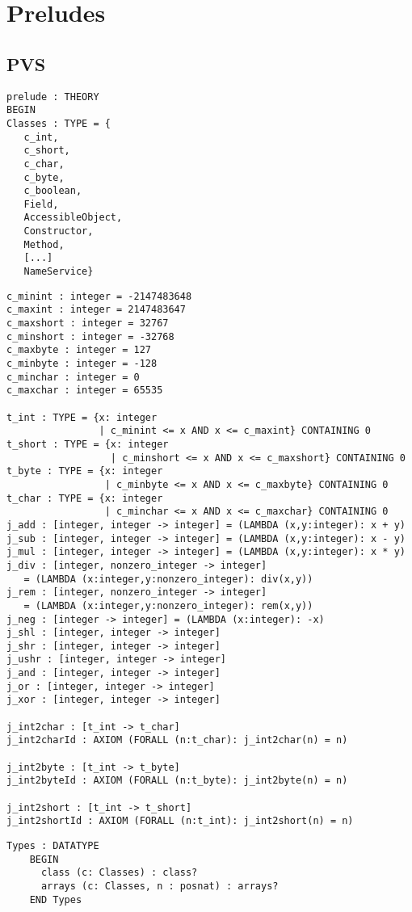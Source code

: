 \chapter{Preludes}
\section{PVS}
 \begin{verbatim}
prelude : THEORY
BEGIN
Classes : TYPE = {
   c_int,
   c_short,
   c_char,
   c_byte,
   c_boolean,
   Field,
   AccessibleObject,
   Constructor,
   Method,
   [...]
   NameService}
\end{verbatim}
\begin{verbatim}
c_minint : integer = -2147483648
c_maxint : integer = 2147483647
c_maxshort : integer = 32767
c_minshort : integer = -32768
c_maxbyte : integer = 127
c_minbyte : integer = -128
c_minchar : integer = 0
c_maxchar : integer = 65535

t_int : TYPE = {x: integer 
                | c_minint <= x AND x <= c_maxint} CONTAINING 0
t_short : TYPE = {x: integer 
                  | c_minshort <= x AND x <= c_maxshort} CONTAINING 0
t_byte : TYPE = {x: integer 
                 | c_minbyte <= x AND x <= c_maxbyte} CONTAINING 0
t_char : TYPE = {x: integer 
                 | c_minchar <= x AND x <= c_maxchar} CONTAINING 0
j_add : [integer, integer -> integer] = (LAMBDA (x,y:integer): x + y)
j_sub : [integer, integer -> integer] = (LAMBDA (x,y:integer): x - y)
j_mul : [integer, integer -> integer] = (LAMBDA (x,y:integer): x * y)
j_div : [integer, nonzero_integer -> integer] 
   = (LAMBDA (x:integer,y:nonzero_integer): div(x,y))
j_rem : [integer, nonzero_integer -> integer] 
   = (LAMBDA (x:integer,y:nonzero_integer): rem(x,y))
j_neg : [integer -> integer] = (LAMBDA (x:integer): -x)
j_shl : [integer, integer -> integer]
j_shr : [integer, integer -> integer]
j_ushr : [integer, integer -> integer]
j_and : [integer, integer -> integer]
j_or : [integer, integer -> integer]
j_xor : [integer, integer -> integer]

j_int2char : [t_int -> t_char]
j_int2charId : AXIOM (FORALL (n:t_char): j_int2char(n) = n)

j_int2byte : [t_int -> t_byte]
j_int2byteId : AXIOM (FORALL (n:t_byte): j_int2byte(n) = n)

j_int2short : [t_int -> t_short]
j_int2shortId : AXIOM (FORALL (n:t_int): j_int2short(n) = n)
\end{verbatim}
\begin{verbatim}
Types : DATATYPE
    BEGIN
      class (c: Classes) : class?
      arrays (c: Classes, n : posnat) : arrays?
    END Types
\end{verbatim}
